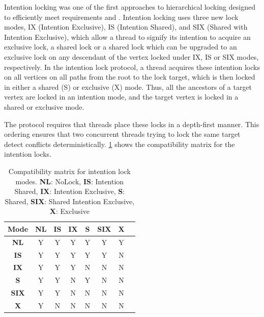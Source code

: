 Intention locking was one of the first approaches to hierarchical locking designed to efficiently meet requirements \Rb and \Rc. Intention locking uses three new lock modes, IX (Intention Exclusive), IS (Intention Shared), and SIX (Shared with Intention Exclusive), which allow a thread to signify its intention to acquire an exclusive lock, a shared lock or a shared lock which can be upgraded to an exclusive lock on any descendant of the vertex locked under IX, IS or SIX modes, respectively. In the intention lock protocol, a thread acquires these intention locks on all vertices on all paths from the root to the lock target, which is then locked in either a shared (S) or exclusive (X) mode. Thus, all the ancestors of a target vertex are locked in an intention mode, and the target vertex is locked in a shared or exclusive mode.

The protocol requires that threads place these locks in a depth-first manner. This ordering ensures that two concurrent threads trying to lock the same target detect conflicts deterministically. \cref{tab:intention_locks} shows the compatibility matrix for the intention locks.



\begin{table}[h]
    \centering
    \captionsetup{justification=centering}
    \begin{tabular}{c|ccccccc}
        \textbf{Mode} & \textbf{NL} & \textbf{IS} & \textbf{IX} & \textbf{S} & \textbf{SIX} & \textbf{X}\\
        \hline
        \textbf{NL} & \cellcolor{green!25} Y & \cellcolor{green!25} Y & \cellcolor{green!25} Y & \cellcolor{green!25} Y & \cellcolor{green!25} Y & \cellcolor{green!25} Y \\
        \textbf{IS} &  \cellcolor{green!25} Y & \cellcolor{green!25} Y & \cellcolor{green!25} Y & \cellcolor{green!25} Y & \cellcolor{green!25} Y & \cellcolor{red!25} N \\
        \textbf{IX} &  \cellcolor{green!25} Y & \cellcolor{green!25} Y & \cellcolor{green!25} Y & \cellcolor{red!25} N & \cellcolor{red!25} N & \cellcolor{red!25} N \\
        \textbf{S} &  \cellcolor{green!25} Y & \cellcolor{green!25} Y & \cellcolor{red!25} N & \cellcolor{green!25} Y & \cellcolor{red!25} N & \cellcolor{red!25} N \\
        \textbf{SIX} &  \cellcolor{green!25} Y & \cellcolor{green!25} Y & \cellcolor{red!25} N & \cellcolor{red!25} N & \cellcolor{red!25} N & \cellcolor{red!25} N \\
        \textbf{X} &  \cellcolor{green!25} Y & \cellcolor{red!25} N & \cellcolor{red!25} N & \cellcolor{red!25} N & \cellcolor{red!25} N & \cellcolor{red!25} N \\
    \end{tabular}
    \caption{Compatibility matrix for intention lock modes. \textbf{NL}: NoLock, \textbf{IS}: Intention Shared, \textbf{IX}: Intention Exclusive, \textbf{S}: Shared, \textbf{SIX}: Shared Intention Exclusive, \textbf{X}: Exclusive}
    \label{tab:intention_locks}
\end{table}



